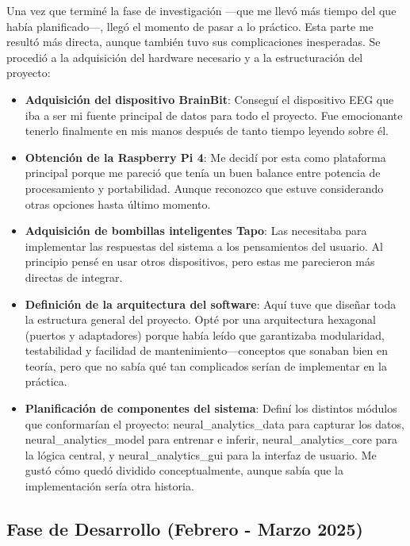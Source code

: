 Una vez que terminé la fase de investigación —que me llevó más tiempo del que había planificado—, llegó el momento de pasar a lo práctico. Esta parte me resultó más directa, aunque también tuvo sus complicaciones inesperadas. Se procedió a la adquisición del hardware necesario y a la estructuración del proyecto:

\begin{itemize}
    \item \textbf{Adquisición del dispositivo BrainBit}: Conseguí el dispositivo EEG que iba a ser mi fuente principal de datos para todo el proyecto. Fue emocionante tenerlo finalmente en mis manos después de tanto tiempo leyendo sobre él.
    
    \item \textbf{Obtención de la Raspberry Pi 4}: Me decidí por esta como plataforma principal porque me pareció que tenía un buen balance entre potencia de procesamiento y portabilidad. Aunque reconozco que estuve considerando otras opciones hasta último momento.
    
    \item \textbf{Adquisición de bombillas inteligentes Tapo}: Las necesitaba para implementar las respuestas del sistema a los pensamientos del usuario. Al principio pensé en usar otros dispositivos, pero estas me parecieron más directas de integrar.
    
    \item \textbf{Definición de la arquitectura del software}: Aquí tuve que diseñar toda la estructura general del proyecto. Opté por una arquitectura hexagonal (puertos y adaptadores) porque había leído que garantizaba modularidad, testabilidad y facilidad de mantenimiento—conceptos que sonaban bien en teoría, pero que no sabía qué tan complicados serían de implementar en la práctica.
    
    \item \textbf{Planificación de componentes del sistema}: Definí los distintos módulos que conformarían el proyecto: neural\_analytics\_data para capturar los datos, neural\_analytics\_model para entrenar e inferir, neural\_analytics\_core para la lógica central, y neural\_analytics\_gui para la interfaz de usuario. Me gustó cómo quedó dividido conceptualmente, aunque sabía que la implementación sería otra historia.
\end{itemize}

\subsection{Fase de Desarrollo (Febrero - Marzo 2025)}

